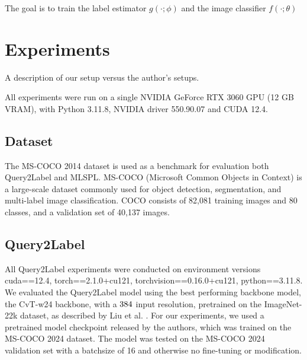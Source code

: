 \documentclass[lettersize,journal]{IEEEtran}
\begin{document}
The goal is to train the label estimator $g(\cdot;\phi)$ and the image classifier $f(\cdot;\theta)$


\section{Experiments}
A description of our setup versus the author's setups.

\vspace{1em}

All experiments were run on a single NVIDIA GeForce RTX 3060 GPU (12 GB VRAM), with Python 3.11.8, NVIDIA driver 550.90.07 and CUDA 12.4. 

\subsection{Dataset}
The MS-COCO 2014 \cite{coco14} dataset is used as a benchmark for evaluation both Query2Label and MLSPL. MS-COCO (Microsoft Common Objects in Context) is a large-scale dataset commonly used for object detection, segmentation, and multi-label image classification. COCO consists of 82,081 training images and 80 classes, and a validation set of 40,137 images.

\subsection{Query2Label}
All Query2Label experiments were conducted on environment versions cuda==12.4, torch==2.1.0+cu121, torchvision==0.16.0+cu121, python==3.11.8.
We evaluated the Query2Label model using the best performing backbone model, the CvT-w24 backbone, with a $384\time 384$ input resolution, pretrained on the ImageNet-22k dataset, as described by Liu et al. \cite{Query2Label}. For our experiments, we used a pretrained model checkpoint released by the authors, which was trained on the MS-COCO 2024 dataset. The model was tested on the MS-COCO 2024 validation set with a batchsize of 16 and otherwise no fine-tuning or modification.

\end{document}
